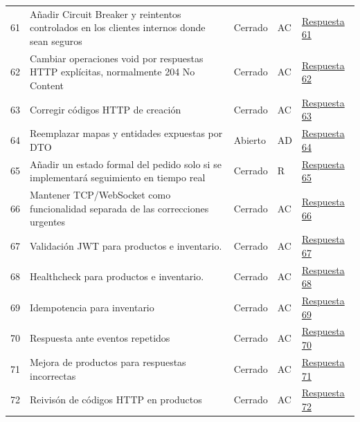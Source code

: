 \documentclass[12pt,a4paper]{article}
\begin{document}
{\begin{longtable}{p{0.6cm}p{6.8cm}p{1.7cm}p{1.1cm}p{2.8cm}}
61 & Añadir Circuit Breaker y reintentos controlados en los clientes internos donde sean seguros & Cerrado & AC & \href{https://github.com/JoseLozanoMorales/TiendaTech/issues/61#issuecomment-5499917467}{Respuesta 61} \\
62 & Cambiar operaciones void por respuestas HTTP explícitas, normalmente 204 No Content & Cerrado & AC & \href{https://github.com/JoseLozanoMorales/TiendaTech/issues/62#issuecomment-5499921148}{Respuesta 62} \\
63 & Corregir códigos HTTP de creación & Cerrado & AC & \href{https://github.com/JoseLozanoMorales/TiendaTech/issues/63#issuecomment-5499923933}{Respuesta 63} \\
64 & Reemplazar mapas y entidades expuestas por DTO & Abierto & AD & \href{https://github.com/JoseLozanoMorales/TiendaTech/issues/64#issuecomment-5499962026}{Respuesta 64} \\
65 & Añadir un estado formal del pedido solo si se implementará seguimiento en tiempo real & Cerrado & R & \href{https://github.com/JoseLozanoMorales/TiendaTech/issues/65#issuecomment-5499926865}{Respuesta 65} \\
66 & Mantener TCP/WebSocket como funcionalidad separada de las correcciones urgentes & Cerrado & AC & \href{https://github.com/JoseLozanoMorales/TiendaTech/issues/66#issuecomment-5499930050}{Respuesta 66} \\
67 & Validación JWT para productos e inventario. & Cerrado & AC & \href{https://github.com/JoseLozanoMorales/TiendaTech/issues/67#issuecomment-5499814085}{Respuesta 67} \\
68 & Healthcheck para productos e inventario. & Cerrado & AC & \href{https://github.com/JoseLozanoMorales/TiendaTech/issues/68#issuecomment-5499537229}{Respuesta 68} \\
69 & Idempotencia para inventario & Cerrado & AC & \href{https://github.com/JoseLozanoMorales/TiendaTech/issues/69#issuecomment-5499933929}{Respuesta 69} \\
70 & Respuesta ante eventos repetidos & Cerrado & AC & \href{https://github.com/JoseLozanoMorales/TiendaTech/issues/70#issuecomment-5499937655}{Respuesta 70} \\
71 & Mejora de productos para respuestas incorrectas & Cerrado & AC & \href{https://github.com/JoseLozanoMorales/TiendaTech/issues/71#issuecomment-5499803326}{Respuesta 71} \\
72 & Reivisón de códigos HTTP en productos & Cerrado & AC & \href{https://github.com/JoseLozanoMorales/TiendaTech/issues/72#issuecomment-5499539698}{Respuesta 72} \\

\end{longtable}}
\end{document}
